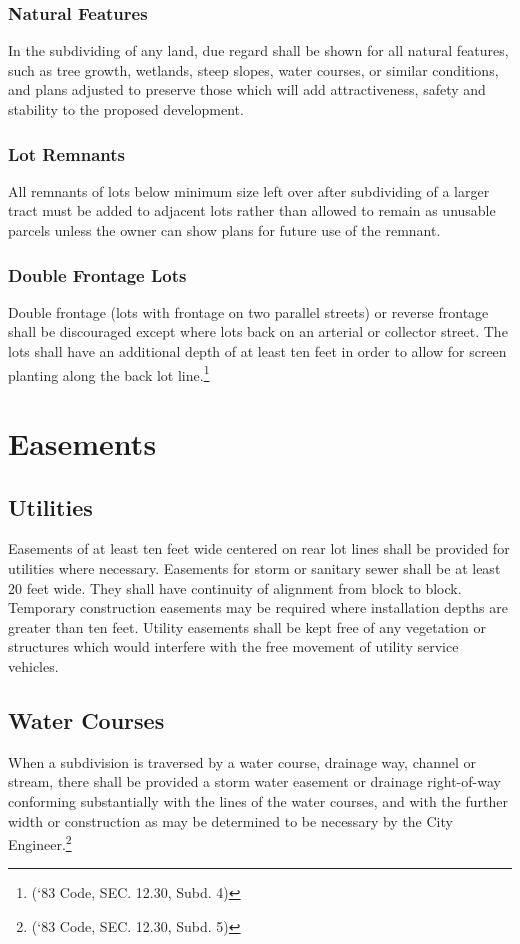 \subsubsection{Natural Features}
In the subdividing of any land, due regard shall be shown for all natural features, such as tree growth, wetlands, steep slopes, water courses, or similar conditions, and plans adjusted to preserve those which will add attractiveness, safety and stability to the proposed development.
\subsubsection{Lot Remnants}
All remnants of lots below minimum size left over after subdividing of a larger tract must be added to adjacent lots rather than allowed to remain as unusable parcels unless the owner can show plans for future use of the remnant.
\subsubsection{Double Frontage Lots}
Double frontage (lots with frontage on two parallel streets) or reverse frontage shall be discouraged except where lots back on an arterial or collector street.  The lots shall have an additional depth of at least ten feet in order to allow for screen planting along the back lot line.\footnote{(‘83 Code, SEC. 12.30, Subd. 4)}

\section{Easements}
\subsection{Utilities}
Easements of at least ten feet wide centered on rear lot lines shall be provided for utilities where necessary. Easements for storm or sanitary sewer shall be at least 20 feet wide. They shall have continuity of alignment from block to block. Temporary construction easements may be required where installation depths are greater than ten feet. Utility easements shall be kept free of any vegetation or structures which would interfere with the free movement of utility service vehicles.
\subsection{Water Courses}
When a subdivision is traversed by a water course, drainage way, channel or stream, there shall be provided a storm water easement or drainage right-of-way conforming substantially with the lines of the water courses, and with the further width or construction as may be determined to be necessary by the City Engineer.\footnote{(‘83 Code, SEC. 12.30, Subd. 5)}

